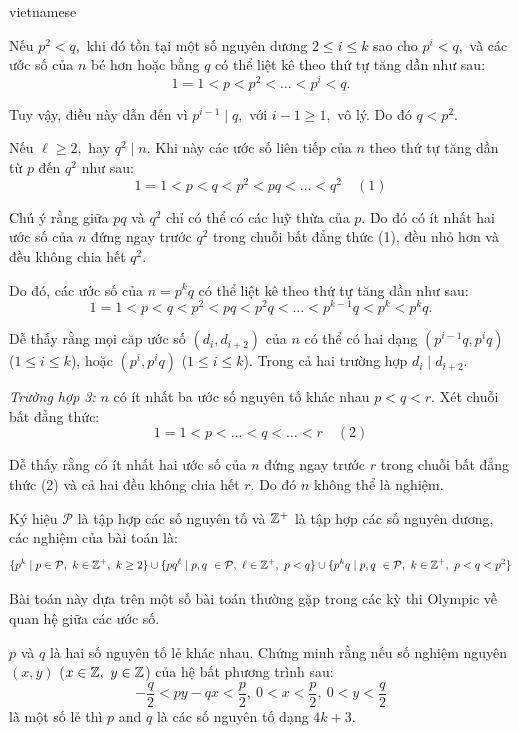 \documentclass{article}
\begin{document}
\begin{otherlanguage*}{vietnamese}
\begin{soln}
    Nếu $p^2 < q,$ khi đó tồn tại một số nguyên dương $2 \le i \le k $ sao cho $p^i < q,$ và các ước số của $n$ bé hơn hoặc bằng $q$ có thể liệt kê theo thứ tự tăng dần như sau:
    \[
        1 = 1 < p < p^2 < \ldots < p^i < q.
    \]

    Tuy vậy, điều này dẫn đến vì $p^{i-1} \mid q,$ với $i-1 \ge 1,$ vô lý. Do đó $q<p^2.$ 
    
    Nếu $\ell \ge 2,$ hay $q^2 \mid n.$ Khi này các ước số liên tiếp của $n$ theo thứ tự tăng dần từ $p$ đến $q^2$ như sau:
    \[
        1 = 1 < p < q < p^2 < pq < \ldots < q^2 \quad (1)
    \]

    Chú ý rằng giữa $pq$ và $q^2$ chỉ có thể có các luỹ thừa của $p$. Do đó có ít nhất hai ước số của $n$ đứng ngay trước $q^2$ trong chuỗi bất đẳng thức (1),
    đều nhỏ hơn và đều không chia hết $q^2.$
    
    Do đó, các ước số của $n = p^kq$ có thể liệt kê theo thứ tự tăng dần như sau:
    \[
        1 = 1 < p < q < p^2 < pq < p^2q < \ldots < p^{k-1}q < p^k < p^kq.
    \]

    Dễ thấy rằng mọi căp ước số $(d_i, d_{i+2})$ của $n$ có thể có hai dạng $(p^{i-1}q, p^{i}q)$ ($1 \le i \le k$), hoặc $(p^{i}, p^{i}q)$ ($1 \le i \le k$).
    Trong cả hai trường hợp $d_i \mid d_{i+2}.$ 
    
    \textit{Trường hợp 3:} $n$ có ít nhất ba ước số nguyên tố khác nhau $p<q<r.$
    Xét chuỗi bất đẳng thức:
    \[
        1 = 1 < p < \ldots < q < \ldots < r \quad (2)
    \]

    Dễ thấy rằng có ít nhất hai ước số của $n$ đứng ngay trước $r$ trong chuỗi bất đẳng thức (2) và cả hai đều không chia hết $r$.
    Do đó $n$ không thể là nghiệm.

    Ký hiệu $\mathcal{P}$ là tập hợp các số nguyên tố và $\mathbb Z^+$ là tập hợp các số nguyên dương, các nghiệm của bài toán là:
    \[
        \{ p^k \mid p \in \mathcal{P},\ k \in \mathbb Z^+,\ k \ge 2 \} \cup 
        \{ pq^{\ell} \mid p, q\ \in \mathcal{P},\ \ell \in \mathbb Z^+,\ p < q \} \cup
        \{ p^kq \mid p, q\ \in \mathcal{P},\ k \in \mathbb Z^+,\ p < q < p^2 \}
    \]
\end{soln}

\begin{remark*}
    Bài toán này dựa trên một số bài toán thường gặp trong các kỳ thi Olympic về quan hệ giữa các ước số.
\end{remark*}

\newpage

\begin{problem*}
    $p$ và $q$ là hai số nguyên tố lẻ khác nhau. Chứng minh rằng nếu số nghiệm nguyên $(x,y)$ ($x \in \mathbb Z,\ y \in \mathbb Z$) của hệ bất phương trình sau:
    \[
        -\frac{q}{2} < py - qx < \frac{p}{2},\ 0 < x < \frac{p}{2},\ 0 < y < \frac{q}{2}
    \]
    là một số lẻ thì $p$ and $q$ là các số nguyên tố dạng $4k+3.$
\end{problem*}


\end{otherlanguage*}
\end{document}
